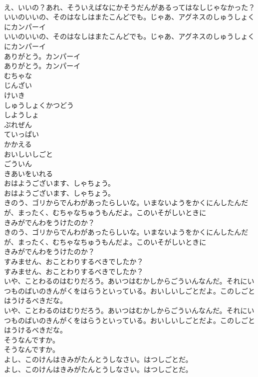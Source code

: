 \documentclass[8pt]{extreport}
\begin{document}
\begin{CJK}{UTF8}{min}
\\	え、いいの？あれ、そういえばなにかそうだんがあるってはなしじゃなかった？
\\	いいのいいの、そのはなしはまたこんどでも。じゃあ、アグネスのしゅうしょくにカンパーイ
\\	いいのいいの、そのはなしはまたこんどでも。じゃあ、アグネスのしゅうしょくにカンパーイ
\\	ありがとう。カンパーイ
\\	ありがとう。カンパーイ
\\	むちゃな
\\	じんざい
\\	けいき
\\	しゅうしょくかつどう
\\	しようしょ
\\	ぷれぜん
\\	ていっぱい
\\	かかえる
\\	おいしいしごと
\\	ごういん
\\	きあいをいれる
\\	おはようございます、しゃちょう。
\\	おはようございます、しゃちょう。
\\	きのう、ゴリからでんわがあったらしいな。いまないようをかくにんしたんだが、まったく、むちゃなちゅうもんだよ。このいそがしいときに
\\	きみがでんわをうけたのか？
\\	きのう、ゴリからでんわがあったらしいな。いまないようをかくにんしたんだが、まったく、むちゃなちゅうもんだよ。このいそがしいときに
\\	きみがでんわをうけたのか？
\\	すみません、おことわりするべきでしたか？
\\	すみません、おことわりするべきでしたか？
\\	いや、ことわるのはむりだろう。あいつはむかしからごういんなんだ。それにいつものばいのきんがくをはらうといっている。おいしいしごとだよ。このしごとはうけるべきだな。
\\	いや、ことわるのはむりだろう。あいつはむかしからごういんなんだ。それにいつものばいのきんがくをはらうといっている。おいしいしごとだよ。このしごとはうけるべきだな。
\\	そうなんですか。
\\	そうなんですか。
\\	よし、このけんはきみがたんとうしなさい。はつしごとだ。
\\	よし、このけんはきみがたんとうしなさい。はつしごとだ。

\end{CJK}
\end{document}
